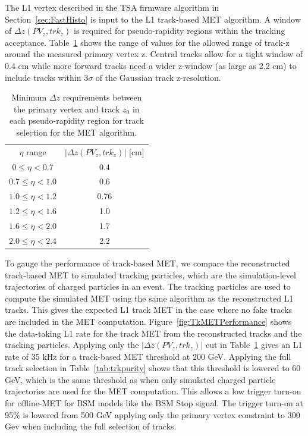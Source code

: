The L1 vertex described in the TSA firmware algorithm in Section~\ref{sec:FastHisto} is input to the L1 track-based MET algorithm. A window of $\Delta z\left(PV_{z}, trk_{z}\right)$ is required for pseudo-rapidity regions within the tracking acceptance. Table~\ref{tab:zwindows} shows the range of values for the allowed range of track-z around the measured primary vertex z. Central tracks allow for a tight window of 0.4 cm while more forward tracks need a wider z-window (as large as 2.2 cm) to include tracks within $3\sigma$ of the Gaussian track z-resolution.
\begin{table}[h]
\begin{tabular}{|c|c|}
$\eta$ range & $\vert \Delta z\left(PV_{z}, trk_{z}\right) \vert$  [cm] \\
 $0\leq \eta < 0.7$ & 0.4\\
$0.7\leq \eta <1.0 $& 0.6\\
$1.0\leq \eta < 1.2 $ & 0.76\\
$1.2\leq \eta < 1.6$ & 1.0 \\
$1.6\leq \eta <  2.0 $& 1.7 \\
$2.0\leq  \eta < 2.4 $ & 2.2 \\
\end{tabular}
\caption{Minimum $\Delta z $ requirements between the primary vertex and track $z_{0}$ in each pseudo-rapidity region for track selection for the MET algorithm. }
\label{tab:zwindows}
\end{table}

To gauge the performance of track-based MET, we compare the reconstructed track-based MET to simulated tracking particles, which are the simulation-level trajectories of charged particles in an event. The tracking particles are used to compute the simulated MET using the same algorithm as the reconstructed L1 tracks. This gives the expected L1 track MET in the case where no fake tracks are included in the MET computation. Figure~\ref{fig:TkMETPerformance} shows the data-taking L1 rate for the track MET from the reconstructed tracks and the tracking particles. Applying only the $\vert \Delta z\left(PV_{z}, trk_{z}\right) \vert$ cut in Table~\ref{tab:zwindows} gives an L1 rate of 35 kHz for a track-based MET threshold at 200 GeV. Applying the full track selection in Table~\ref{tab:trkpurity} shows that this threshold is lowered to 60 GeV, which is the same threshold as when only simulated charged particle trajectories are used for the MET computation.
This allows a low trigger turn-on for offline-MET for BSM models like the BSM Stop signal. The trigger turn-on at 95$\%$ is lowered from 500 GeV applying only the primary vertex constraint to 300 Gev when including the full selection of tracks.


